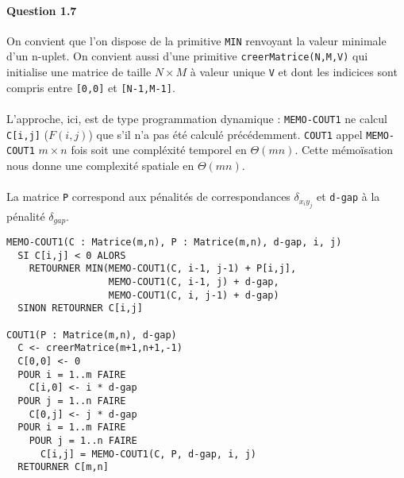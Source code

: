 \paragraph{Question 1.7}
On convient que l'on dispose de la primitive \verb'MIN' renvoyant la
valeur minimale d'un n-uplet. On convient aussi d'une primitive
\verb'creerMatrice(N,M,V)' qui initialise une matrice de taille
$N\times M$ \`a valeur unique \verb'V' et dont les indicices sont
compris entre \verb'[0,0]' et \verb'[N-1,M-1]'.
\\\\
L'approche, ici, est de type programmation dynamique :
\verb'MEMO-COUT1' ne calcul \verb'C[i,j]' ($F(i,j)$) que s'il n'a pas
\'et\'e calcul\'e pr\'ec\'edemment. \verb'COUT1' appel
\verb'MEMO-COUT1' $m\times n$ fois soit une compl\'exit\'e temporel en
$\Theta(mn)$. Cette m\'emo\"isation nous donne une complexit\'e
spatiale en $\Theta(mn)$.
\\\\
La matrice \verb'P' correspond aux p\'enalit\'es de correspondances
$\delta_{x_iy_j}$ et \verb'd-gap' \`a la p\'enalit\'e $\delta_{gap}$.
\begin{verbatim}
MEMO-COUT1(C : Matrice(m,n), P : Matrice(m,n), d-gap, i, j)
  SI C[i,j] < 0 ALORS
    RETOURNER MIN(MEMO-COUT1(C, i-1, j-1) + P[i,j],
                  MEMO-COUT1(C, i-1, j) + d-gap,
                  MEMO-COUT1(C, i, j-1) + d-gap)
  SINON RETOURNER C[i,j]

COUT1(P : Matrice(m,n), d-gap)
  C <- creerMatrice(m+1,n+1,-1)
  C[0,0] <- 0
  POUR i = 1..m FAIRE
    C[i,0] <- i * d-gap
  POUR j = 1..n FAIRE
    C[0,j] <- j * d-gap
  POUR i = 1..m FAIRE
    POUR j = 1..n FAIRE
      C[i,j] = MEMO-COUT1(C, P, d-gap, i, j)
  RETOURNER C[m,n]
\end{verbatim}
\pagebreak
